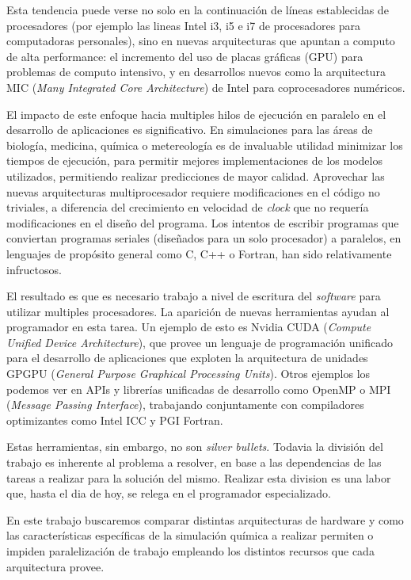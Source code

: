 Esta tendencia puede verse no solo en la continuaci\'on de l\'ineas establecidas
de procesadores (por ejemplo las lineas Intel i3, i5 e i7 de procesadores para computadoras
personales), sino en nuevas arquitecturas que apuntan a computo de alta performance: el incremento
del uso de placas gr\'aficas (GPU) para problemas de computo intensivo, y en desarrollos
nuevos como la arquitectura MIC (\textit{Many Integrated Core Architecture}) de
Intel para coprocesadores num\'ericos.

El impacto de este enfoque hacia multiples hilos de ejecuci\'on en paralelo en el
desarrollo de aplicaciones es significativo. En simulaciones para las \'areas de biolog\'ia,
medicina, qu\'imica o metereolog\'ia es de invaluable utilidad minimizar los tiempos
de ejecuci\'on, para permitir mejores implementaciones de los modelos utilizados,
permitiendo realizar predicciones de mayor calidad. Aprovechar las nuevas
arquitecturas multiprocesador requiere modificaciones en el c\'odigo no triviales,
a diferencia del crecimiento en velocidad de \textit{clock} que no requer\'ia modificaciones
en el dise\~no del programa. Los intentos de escribir programas que conviertan
programas seriales (dise\~nados para un solo procesador) a paralelos, en lenguajes
de prop\'osito general como C, C++ o Fortran, han sido relativamente infructosos.

El resultado es que es necesario trabajo a nivel de escritura del \textit{software}
para utilizar multiples procesadores. La aparici\'on de nuevas herramientas ayudan
al programador en esta tarea. Un ejemplo de esto es Nvidia CUDA (\textit{Compute
Unified Device Architecture}), que provee un lenguaje de programaci\'on unificado
para el desarrollo de aplicaciones que exploten la arquitectura de unidades GPGPU
(\textit{General Purpose Graphical Processing Units}). Otros ejemplos los podemos
ver en APIs y librer\'ias unificadas de desarrollo como OpenMP o MPI
(\textit{Message Passing Interface}), trabajando conjuntamente con compiladores
optimizantes como Intel ICC y PGI Fortran.

Estas herramientas, sin embargo, no son \textit{silver bullets}. Todavia la divisi\'on
del trabajo es inherente al problema a resolver, en base a las dependencias de las tareas
a realizar para la soluci\'on del mismo. Realizar esta division es una labor que, hasta
el dia de hoy, se relega en el programador especializado.

En este trabajo buscaremos comparar distintas arquitecturas de hardware y como
las caracter\'isticas espec\'ificas de la simulaci\'on qu\'imica a realizar permiten
o impiden paralelizaci\'on de trabajo empleando los distintos recursos que cada
arquitectura provee.
